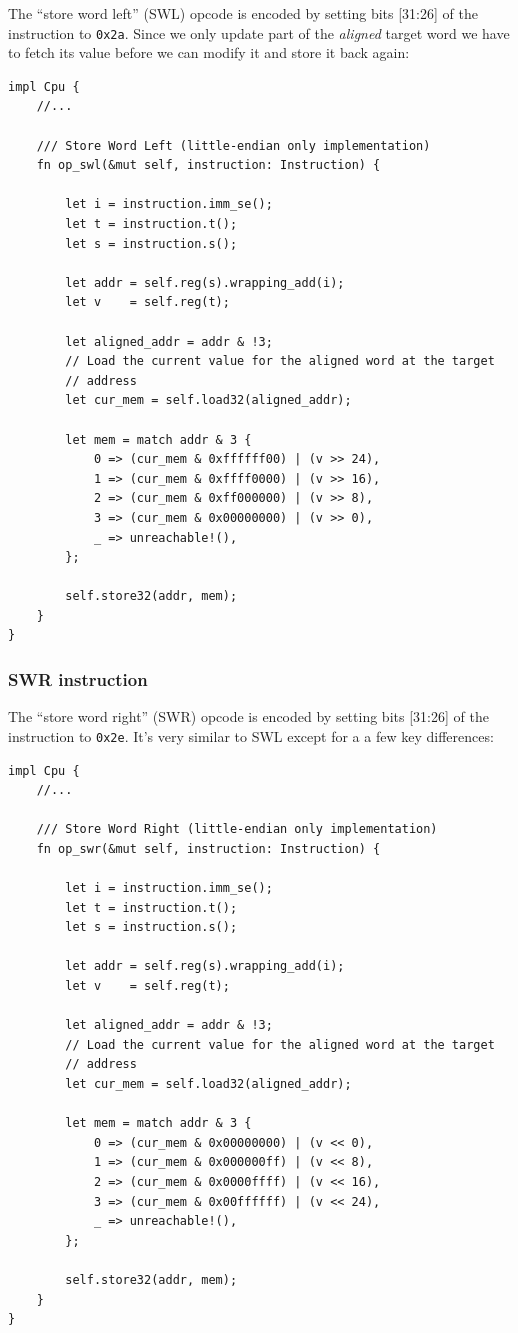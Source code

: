 \documentclass[a4paper]{article}
\newcommand{\code}[1] {\texttt{#1}}
\begin{document}
The ``store word left'' (SWL) opcode is encoded by setting bits
[31:26] of the instruction to \code{0x2a}. Since we only update part
of the \emph{aligned} target word we have to fetch its value before we
can modify it and store it back again:

\begin{lstlisting}
impl Cpu {
    //...

    /// Store Word Left (little-endian only implementation)
    fn op_swl(&mut self, instruction: Instruction) {

        let i = instruction.imm_se();
        let t = instruction.t();
        let s = instruction.s();

        let addr = self.reg(s).wrapping_add(i);
        let v    = self.reg(t);

        let aligned_addr = addr & !3;
        // Load the current value for the aligned word at the target
        // address
        let cur_mem = self.load32(aligned_addr);

        let mem = match addr & 3 {
            0 => (cur_mem & 0xffffff00) | (v >> 24),
            1 => (cur_mem & 0xffff0000) | (v >> 16),
            2 => (cur_mem & 0xff000000) | (v >> 8),
            3 => (cur_mem & 0x00000000) | (v >> 0),
            _ => unreachable!(),
        };

        self.store32(addr, mem);
    }
}
\end{lstlisting}

\subsubsection{SWR instruction}

The ``store word right'' (SWR) opcode is encoded by setting bits
[31:26] of the instruction to \code{0x2e}. It's very similar to SWL
except for a a few key differences:

\begin{lstlisting}
impl Cpu {
    //...

    /// Store Word Right (little-endian only implementation)
    fn op_swr(&mut self, instruction: Instruction) {

        let i = instruction.imm_se();
        let t = instruction.t();
        let s = instruction.s();

        let addr = self.reg(s).wrapping_add(i);
        let v    = self.reg(t);

        let aligned_addr = addr & !3;
        // Load the current value for the aligned word at the target
        // address
        let cur_mem = self.load32(aligned_addr);

        let mem = match addr & 3 {
            0 => (cur_mem & 0x00000000) | (v << 0),
            1 => (cur_mem & 0x000000ff) | (v << 8),
            2 => (cur_mem & 0x0000ffff) | (v << 16),
            3 => (cur_mem & 0x00ffffff) | (v << 24),
            _ => unreachable!(),
        };

        self.store32(addr, mem);
    }
}
\end{lstlisting}
\end{document}
